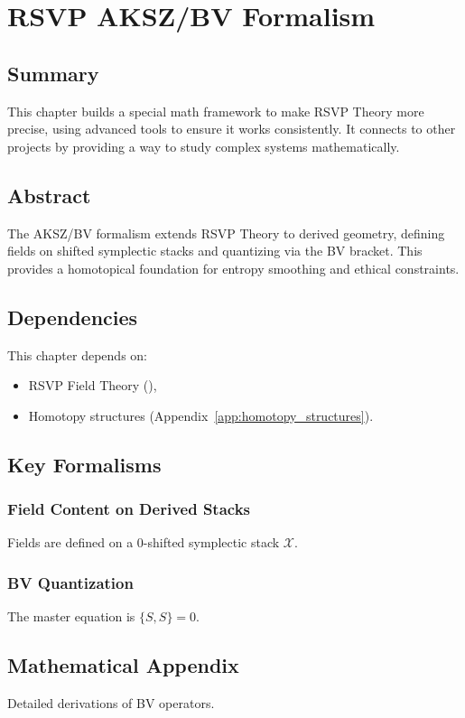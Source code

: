 \documentclass[11pt,oneside]{memoir}
\theoremstyle{plain}
\newcommand{\X}{\mathcal{X}}
\begin{document}
\chapter{RSVP AKSZ/BV Formalism}
\label{sec:rsvp_aksz}
\section{Summary}
This chapter builds a special math framework to make RSVP Theory more precise, using advanced tools to ensure it works consistently. It connects to other projects by providing a way to study complex systems mathematically.

\section{Abstract}
The AKSZ/BV formalism extends RSVP Theory to derived geometry, defining fields on shifted symplectic stacks and quantizing via the BV bracket. This provides a homotopical foundation for entropy smoothing and ethical constraints.

\section{Dependencies}
This chapter depends on:
\begin{itemize}
    \item RSVP Field Theory (),
    \item Homotopy structures (Appendix~\ref{app:homotopy_structures}).
\end{itemize}

\section{Key Formalisms}
\subsection{Field Content on Derived Stacks}
Fields are defined on a 0-shifted symplectic stack \(\X\).

\subsection{BV Quantization}
The master equation is \(\{S, S\} = 0\).

\section{Mathematical Appendix}
Detailed derivations of BV operators.
\end{document}
